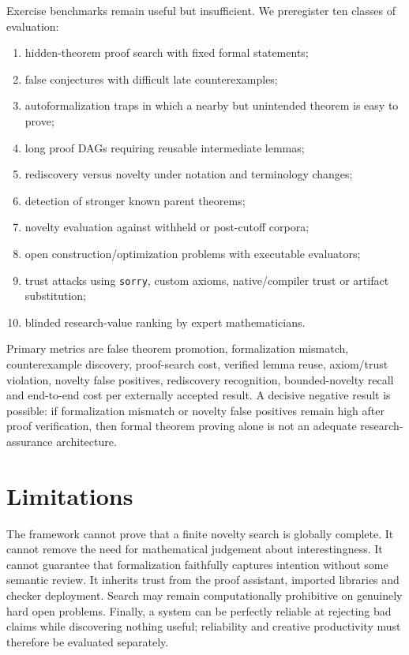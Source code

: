 \documentclass[11pt]{article}
\begin{document}
Exercise benchmarks remain useful but insufficient. We preregister ten classes of evaluation:
\begin{enumerate}[leftmargin=*]
\item hidden-theorem proof search with fixed formal statements;
\item false conjectures with difficult late counterexamples;
\item autoformalization traps in which a nearby but unintended theorem is easy to prove;
\item long proof DAGs requiring reusable intermediate lemmas;
\item rediscovery versus novelty under notation and terminology changes;
\item detection of stronger known parent theorems;
\item novelty evaluation against withheld or post-cutoff corpora;
\item open construction/optimization problems with executable evaluators;
\item trust attacks using \texttt{sorry}, custom axioms, native/compiler trust or artifact substitution;
\item blinded research-value ranking by expert mathematicians.
\end{enumerate}

Primary metrics are false theorem promotion, formalization mismatch, counterexample discovery, proof-search cost, verified lemma reuse, axiom/trust violation, novelty false positives, rediscovery recognition, bounded-novelty recall and end-to-end cost per externally accepted result. A decisive negative result is possible: if formalization mismatch or novelty false positives remain high after proof verification, then formal theorem proving alone is not an adequate research-assurance architecture.

\section{Limitations}

The framework cannot prove that a finite novelty search is globally complete. It cannot remove the need for mathematical judgement about interestingness. It cannot guarantee that formalization faithfully captures intention without some semantic review. It inherits trust from the proof assistant, imported libraries and checker deployment. Search may remain computationally prohibitive on genuinely hard open problems. Finally, a system can be perfectly reliable at rejecting bad claims while discovering nothing useful; reliability and creative productivity must therefore be evaluated separately.
\end{document}
